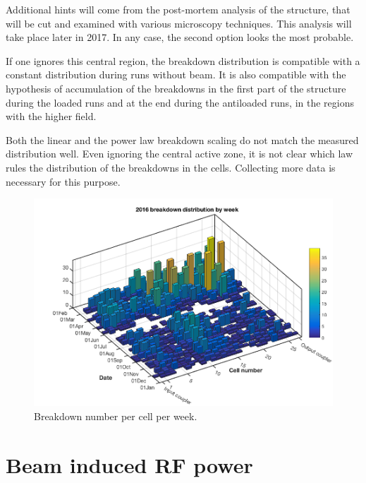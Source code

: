 Additional hints will come from the post-mortem analysis of the structure, that will be cut and examined with various microscopy techniques. This analysis will take place later in 2017. In any case, the second option looks the most probable. 

If one ignores this central region, the breakdown distribution is compatible with a constant distribution during runs without beam. It is also compatible with the hypothesis of accumulation of the breakdowns in  the first part of the structure during the loaded runs and at the end during the antiloaded runs, in the regions with the higher field.

Both the linear and the power law breakdown scaling do not match the measured distribution well. Even ignoring the central active zone, it is not clear which law rules the distribution of the breakdowns in the cells. Collecting more data is necessary for this purpose.

\begin{figure}[h]
\centering 
\includegraphics[scale=0.4]{pictures/week_distr_3D.png}
\caption{Breakdown number per cell per week. }
\label{BD_3d}
\end{figure}








\newpage
\section[Beam induced RF power]{Beam induced RF power}

